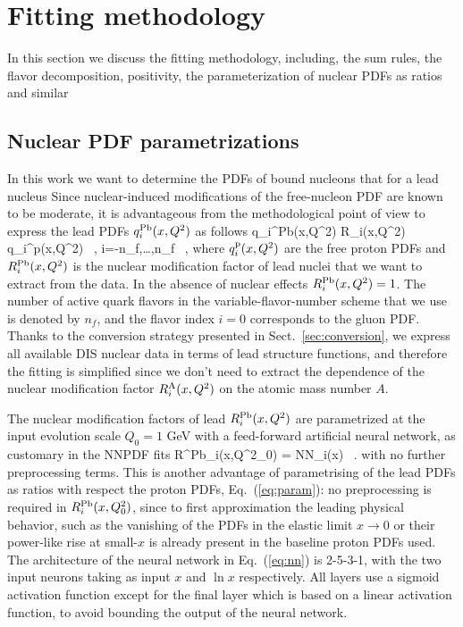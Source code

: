 
\section{Fitting methodology}
\label{sec:fitting}

In this section we discuss the fitting methodology, including, the sum rules,
the flavor decomposition, positivity, the parameterization
of nuclear PDFs as ratios and similar

\subsection{Nuclear PDF parametrizations}

In this work we want to determine the PDFs of bound nucleons that for a lead
nucleus
%
Since nuclear-induced modifications of the free-nucleon PDF are known to be moderate,
it is advantageous from the methodological point of view to express the
lead PDFs $q_{i}^{\rm Pb}(x,Q^2)$ as follows
\be
\label{eq:param}
q_{i}^{\rm Pb}(x,Q^2) \equiv R_i(x,Q^2) \cdot q_{i}^{\rm p}(x,Q^2) \, , \quad i=-n_f,\ldots,n_f \, ,
\ee
where $q_{i}^{\rm p}(x,Q^2)$ are the free proton PDFs and $R^{\rm Pb}_i(x,Q^2)$
is the nuclear modification factor of lead nuclei that we want to extract from the data.
%
In the absence of nuclear effects $R^{\rm Pb}_i(x,Q^2)=1$.
%
The number of active quark flavors in the variable-flavor-number
scheme that we use is denoted by $n_f$, and the flavor index $i=0$ corresponds
to the gluon PDF.
%
Thanks to the conversion strategy presented in Sect.~\ref{sec:conversion},
we express all available DIS nuclear data in terms of lead structure functions,
and therefore the fitting is simplified since we don't need to extract
the dependence of the nuclear modification factor $R^{\rm A}_i(x,Q^2)$ on the atomic
mass number $A$.


The nuclear modification factors of lead $R^{\rm Pb}_i(x,Q^2)$ are parametrized at the
input evolution scale $Q_0=1$ GeV with a feed-forward artificial neural network,
as customary in the NNPDF fits
\be
\label{eq:nn}
R^{\rm Pb}_i(x,Q^2_0) = {\rm NN}_i(x) \, .
\ee
with no further preprocessing terms.
%
This is another advantage of parametrising of the lead PDFs
as ratios with respect the proton PDFs, Eq.~(\ref{eq:param}): no preprocessing
is required in $R^{\rm Pb}_i(x,Q^2_0)$, since to first approximation the leading
physical behavior, such as the vanishing of the PDFs in the elastic limit
$x\to 0$ or their power-like rise at small-$x$ is already present
in the baseline proton PDFs used.
%
The architecture of the neural network in Eq.~(\ref{eq:nn}) is 2-5-3-1,
with the two input neurons taking as input $x$ and  $\ln x$ respectively.
%
All layers use a sigmoid activation function except for the final layer
which is based on a linear activation function, to avoid bounding the output
of the neural network.

